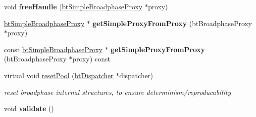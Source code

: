 \begin{DoxyCompactItemize}
\mbox{\label{classbtSimpleBroadphase_a3a5bbfbcb61d3236acc05da1e59dfee6}} 
void {\bfseries free\+Handle} (\hyperlink{structbtSimpleBroadphaseProxy}{bt\+Simple\+Broadphase\+Proxy} $\ast$proxy)
\item 
\mbox{\label{classbtSimpleBroadphase_a1dd4dc9f2796655cf967d7bb9251bd2f}} 
\hyperlink{structbtSimpleBroadphaseProxy}{bt\+Simple\+Broadphase\+Proxy} $\ast$ {\bfseries get\+Simple\+Proxy\+From\+Proxy} (bt\+Broadphase\+Proxy $\ast$proxy)
\item 
\mbox{\label{classbtSimpleBroadphase_a00efad7fee17c1efebc3d8eb1a09a3ec}} 
const \hyperlink{structbtSimpleBroadphaseProxy}{bt\+Simple\+Broadphase\+Proxy} $\ast$ {\bfseries get\+Simple\+Proxy\+From\+Proxy} (bt\+Broadphase\+Proxy $\ast$proxy) const
\item 
\mbox{\label{classbtSimpleBroadphase_a87f396af022189966a021ed79ecdd263}} 
virtual void \hyperlink{classbtSimpleBroadphase_a87f396af022189966a021ed79ecdd263}{reset\+Pool} (\hyperlink{classbtDispatcher}{bt\+Dispatcher} $\ast$dispatcher)
\begin{DoxyCompactList}\small\item\em reset broadphase internal structures, to ensure determinism/reproducability \end{DoxyCompactList}\item 
\mbox{\label{classbtSimpleBroadphase_af866dab98556727f621a3e257ed8ff8f}} 
void {\bfseries validate} ()
\end{DoxyCompactItemize}
